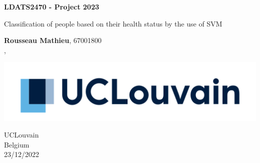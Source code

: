 \begin{titlepage}
	\begin{center}
	  \vspace*{1cm}
		  
	  \Huge
	  \textbf{LDATS2470 - Project 2023}
		  
	  \vspace{0.5cm}
	  \LARGE
	  Classification of people based on their health status by the use of SVM
		  
	  \vspace{2.5cm}
	  
	  \Large
	  \textbf{Rousseau Mathieu}, 67001800 \\
	  \textbf{}, 
	  \textbf{}
		  
	  \vfill
		  
	  \vspace{0.8cm}
		  
	  \includegraphics[width=\textwidth]{figures/logo_ucl.png}
  
	  \vspace{0.8cm}
		  
	  \Large
	  UCLouvain \\
	  Belgium \\
	  23/12/2022
	\end{center}
  \end{titlepage}